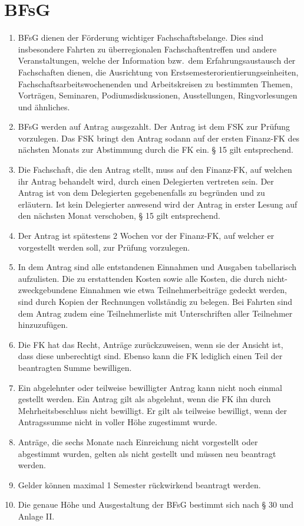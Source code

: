 \documentclass{article}
\begin{document}
\section{BFsG}
\begin{enumerate}[(1)]
    \item BFsG dienen der Förderung wichtiger Fachschaftsbelange. 
    	Dies sind insbesondere Fahrten zu überregionalen Fachschaftentreffen und andere Veranstaltungen, welche der Information bzw.\ dem Erfahrungsaustausch der Fachschaften dienen, die Ausrichtung von Erstsemesterorientierungseinheiten, Fachschaftsarbeitswochenenden und Arbeitskreisen zu bestimmten Themen, Vorträgen, Seminaren, Podiumsdiskussionen, Ausstellungen, Ringvorlesungen und ähnliches.
    \item BFsG werden auf Antrag ausgezahlt. 
    	Der Antrag ist dem FSK zur Prüfung vorzulegen. 
    	Das FSK bringt den Antrag sodann auf der ersten Finanz-FK des nächsten Monats zur Abstimmung durch die FK ein. 
    	§ 15 gilt entsprechend.
    \item Die Fachschaft, die den Antrag stellt, muss auf den Finanz-FK, auf welchen ihr Antrag behandelt wird, durch einen Delegierten vertreten sein. 
    	Der Antrag ist von dem Delegierten gegebenenfalls zu begründen und zu erläutern. 
    	Ist kein Delegierter anwesend wird der Antrag in erster Lesung auf den nächsten Monat verschoben, § 15 gilt entsprechend.
    \item Der Antrag ist spätestens 2 Wochen vor der Finanz-FK, auf welcher er vorgestellt werden soll, zur Prüfung vorzulegen. 
    \item In dem Antrag sind alle entstandenen Einnahmen und Ausgaben tabellarisch aufzulisten. 
    	Die zu erstattenden Kosten sowie alle Kosten, die durch nicht-zweckgebundene Einnahmen wie etwa Teilnehmerbeiträge gedeckt werden, sind durch Kopien der Rechnungen vollständig zu belegen.
    	Bei Fahrten  sind dem Antrag zudem eine Teilnehmerliste mit Unterschriften aller Teilnehmer hinzuzufügen.
    \item Die FK hat das Recht, Anträge zurückzuweisen, wenn sie der Ansicht ist, dass diese unberechtigt sind. 
    	Ebenso kann die FK lediglich einen Teil der beantragten Summe bewilligen.
    \item Ein abgelehnter oder teilweise bewilligter Antrag kann nicht noch einmal gestellt werden. 
    Ein Antrag gilt als abgelehnt, wenn die FK ihn durch Mehrheitsbeschluss nicht bewilligt. 
    Er gilt als teilweise bewilligt, wenn der Antragssumme nicht in voller Höhe zugestimmt wurde.
    \item Anträge, die sechs Monate nach Einreichung nicht vorgestellt oder abgestimmt wurden, gelten als nicht gestellt und müssen neu beantragt werden.
    \item Gelder können maximal 1 Semester rückwirkend beantragt werden.
    \item Die genaue Höhe und Ausgestaltung der BFsG bestimmt sich nach § 30 und Anlage II.
\end{enumerate}
\end{document}
